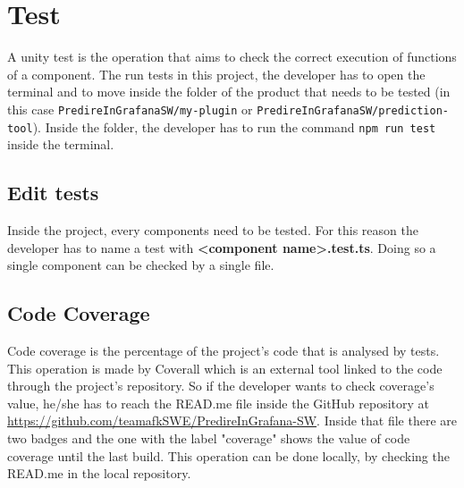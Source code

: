 \section{Test}
A unity test is the operation that aims to check the correct execution of functions of a component.
The run tests in this project, the developer has to open the terminal and to move inside the folder of the product that needs to be tested (in this case \texttt{PredireInGrafanaSW/my-plugin} or \texttt{PredireInGrafanaSW/prediction-tool}). Inside the folder, the developer has to run the command \texttt{npm run test} inside the terminal. 
\subsection{Edit tests}
Inside the project, every components need to be tested. For this reason the developer has to name a test with \textbf{<component name>.test.ts}. Doing so a single component can be checked by a single file.
\subsection{Code Coverage}
Code coverage is the percentage of the project's code that is analysed by tests. This operation is made by Coverall which is an external tool linked to the code through the project's repository. So if the developer wants to check coverage's value, he/she has to reach the READ.me file inside the GitHub repository at \url{https://github.com/teamafkSWE/PredireInGrafana-SW}. Inside that file there are two badges and the one with the label "coverage" shows the value of code coverage until the last build. This operation can be done locally, by checking the READ.me in the local repository. 